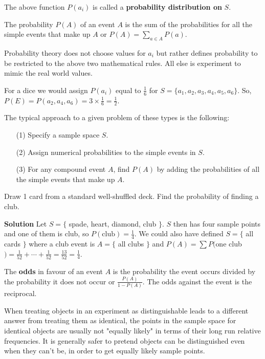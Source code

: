 \documentclass[english, 11pt]{article}
\begin{document}
  The above function $P(a_i)$ is called a \textbf{probability distribution on} $S$.

  \begin{defn}
    The probability $P(A)$ of an event $A$ is the sum of the probabilities for all the simple events that make up $A$ or $P(A) = \sum_{a \in A} P(a)$.
  \end{defn}

  Probability theory does not choose values for $a_i$ but rather defines probability to be restricted to the above two mathematical rules. All else is experiment to mimic the real world values.

  \begin{exmp}
    For a dice we would assign $P(a_i)$ equal to $\frac{1}{6}$ for $S = \{a_1, a_2, a_3, a_4, a_5, a_6\}$. So, $P(E) = P(a_2, a_4, a_6) = 3\times\frac{1}{6} = \frac{1}{2}$.
  \end{exmp}

  The typical approach to a given problem of these types is the following:
  \begin{itemize}
    \item[(1)] Specify a sample space $S$.
    \item[(2)] Assign numerical probabilities to the simple events in $S$.
    \item[(3)] For any compound event $A$, find $P(A)$ by adding the probabilities of all the simple events that make up $A$.
  \end{itemize}

  \begin{exmp}
    Draw 1 card from a standard well-shuffled deck. Find the probability of finding a club.
  \end{exmp}
  \textbf{Solution} Let $S = \{$ spade, heart, diamond, club $\}$. $S$ then has four sample points and one of them is club, so $P(\mbox{club}) = \frac{1}{4}$.
  We could also have defined $S = \{$ all cards $\}$ where a club event is $A = \{$ all clubs $\}$ and $P(A) = \sum P($one club$) = \frac{1}{52} + \cdots + \frac{1}{52} = \frac{13}{52} = \frac{1}{4}$.

  \begin{defn}
    The \textbf{odds} in favour of an event $A$ is the probability the event occurs divided by the probability it does not occur or $\frac{P(A)}{1-P(A)}$. The odds against the event is the reciprocal.
  \end{defn}

  When treating objects in an experiment as distinguishable leads to a different answer from treating them as identical, the points in the sample space for identical objects are usually not "equally likely" in terms of their long run relative frequencies. It is generally safer to pretend objects can be distinguished even when they can't be, in order to get equally likely sample points.
\end{document}
